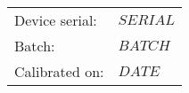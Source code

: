 \documentclass[8pt]{letter}
\begin{document}
\pagestyle{empty}
\begin{center}
\begin{tabular}{ll}
Device serial: & \textbf{$SERIAL$}\\
Batch: & $BATCH$\\
Calibrated on: & $DATE$\\
\end{tabular}
\end{center}
\end{document}
